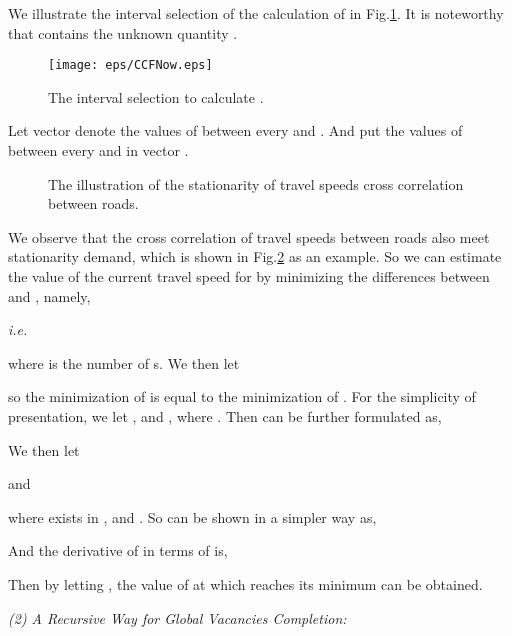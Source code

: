 \documentclass[twocolumn,10pt,final,conference]{IEEEtran}
\def\ie{\textit{i.e.}\xspace}
\begin{document}
We illustrate the interval selection of the  calculation of  in Fig.\ref{fig-illustration of CCFNow}. It is noteworthy that  contains the unknown quantity .

\begin{figure}[!h]
  \centering
\texttt{[image: eps/CCFNow.eps]}\\
  \caption{The  interval selection to calculate .}
  \label{fig-illustration of CCFNow}

\end{figure}

Let vector  denote the values of  between every  and .  And put the values of  between every  and  in vector .

\begin{figure}[h]
\centering
{}
\caption{The illustration of the stationarity of travel speeds cross correlation between roads.}
\label{fig-ccf-stationary}
\end{figure}
We observe that the cross correlation of travel speeds between roads also meet stationarity demand, which is shown in Fig.\ref{fig-ccf-stationary} as an example.
So we can estimate the value of the current travel speed  for  by minimizing the differences between  and , namely,

\ie

where  is the number of s.
We then let

so the minimization of  is equal to the minimization of .
For the simplicity of presentation, we let , and , where .
Then  can be further formulated as,

We then let

and

where  exists in ,  and .
So  can be shown in a simpler way as,

And the derivative of  in terms of  is,

Then by letting , the value of  at which  reaches its minimum can be obtained.

\emph{(2) A Recursive Way for Global Vacancies Completion:}
\quad
\end{document}
